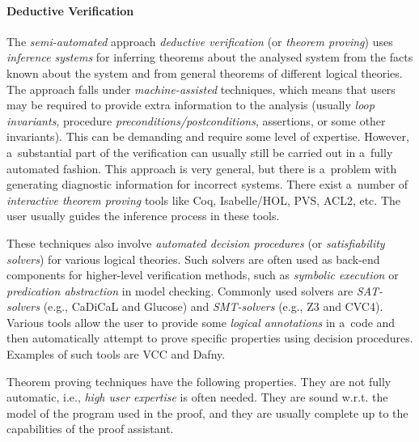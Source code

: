 \paragraph{Deductive Verification}
The \emph{semi-automated} approach \emph{deductive verification} (or \emph{theorem proving}) uses \emph{inference systems} for inferring theorems about the analysed system from the facts known about the system and from general theorems of different logical theories. The approach falls under \emph{machine-assisted} techniques, which means that users may be required to provide extra information to the analysis (usually \emph{loop invariants}, procedure \emph{preconditions/postconditions}, assertions, or some other invariants). This can be demanding and require some level of expertise. However, a~substantial part of the verification can usually still be carried out in a~fully automated fashion. This approach is very general, but there is a~problem with generating diagnostic information for incorrect systems. There exist a~number of \emph{interactive theorem proving} tools like Coq, Isabelle/HOL, PVS, ACL2, etc. The user usually guides the inference process in these tools.

These techniques also involve \emph{automated decision procedures} (or \emph{satisfiability solvers}) for various logical theories. Such solvers are often used as back-end components for higher-level verification methods, such as \emph{symbolic execution} or \emph{predication abstraction} in model checking. Commonly used solvers are \emph{SAT-solvers} (e.g., CaDiCaL and Glucose) and \emph{SMT-solvers} (e.g., Z3 and CVC4). Various tools allow the user to provide some \emph{logical annotations} in a~code and then automatically attempt to prove specific properties using decision procedures. Examples of such tools are VCC and Dafny.

Theorem proving techniques have the following properties. They are not fully automatic, i.e., \emph{high user expertise} is often needed. They are sound w.r.t. the model of the program used in the proof, and they are usually complete up to the capabilities of the proof assistant.

